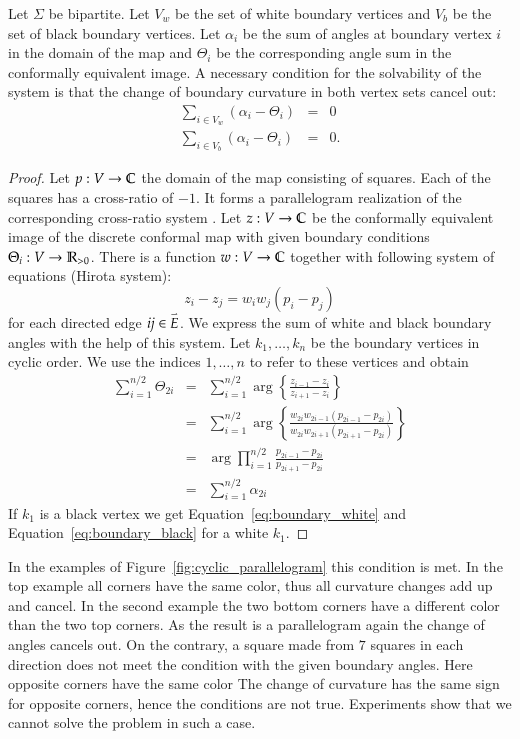 \documentclass[Thesis]{subfiles}
\begin{document}
\begin{theorem}
Let $\Sigma$ be bipartite. Let $V_w$ be the set of white boundary vertices and $V_b$ be the set of black boundary vertices.
Let $\alpha_i$ be the sum of angles at boundary vertex $i$ in the domain of the map and $\Theta_i$ be the corresponding angle sum in the conformally equivalent image.
A necessary condition for the solvability of the system is that the change of boundary curvature in both vertex sets cancel out:
\begin{eqnarray}
\sum_{i\in V_w}(\alpha_i - \Theta_i) &=& 0\label{eq:boundary_white}\\
\sum_{i\in V_b}(\alpha_i - \Theta_i) &=& 0\label{eq:boundary_black}.
\end{eqnarray}
\end{theorem}

\begin{proof}
Let $p:V\to \mathbb C$ the domain of the map consisting of squares. Each of the squares has a cross-ratio of $-1$. 
It forms a parallelogram realization of the corresponding cross-ratio system \cite[pp. 311--318]{BobenkoSuris2008}. 
Let $z:V\to \mathbb C$ be the conformally equivalent image of the discrete conformal map with given boundary conditions $\Theta_i:V\to \mathbb R_{>0}$. 
There is a function $w:V\to \mathbb C$ together with following system of equations (Hirota system):
\begin{equation*}
z_i-z_j=w_iw_j(p_i-p_j)
\end{equation*}
for each directed edge $\it ij \in \accentset{\rightharpoonup}{E}$.
We express the sum of white and black boundary angles with the help of this system. 
Let $k_1,\ldots,k_n$ be the boundary vertices in cyclic order.
We use the indices $1,\ldots,n$ to refer to these vertices and obtain
\begin{eqnarray*}
\sum_{i=1}^{n/2}\Theta_{2i} &=&\sum_{i=1}^{n/2}\arg\left\{\frac{z_{i-1}-z_i}{z_{i+1}-z_i}\right\}\\
&=&\sum_{i=1}^{n/2}\arg\left\{\frac{w_{2i}w_{2i-1}(p_{2i-1}-p_{2i})}{w_{2i}w_{2i+1}(p_{2i+1}-p_{2i})}\right\}\\
&=&\arg\prod_{i=1}^{n/2}\frac{p_{2i-1}-p_{2i}}{p_{2i+1}-p_{2i}}\\
&=&\sum_{i=1}^{n/2}\alpha_{2i}
\end{eqnarray*}
If $k_1$ is a black vertex we get Equation~\ref{eq:boundary_white} and Equation~\ref{eq:boundary_black} for a white $k_1$.
\end{proof}

In the examples of Figure~\ref{fig:cyclic_parallelogram} this condition is met. 
In the top example all corners have the same color, thus all curvature changes add up and cancel.
In the second example the two bottom corners have a different color than the two top corners.
As the result is a parallelogram again the change of angles cancels out.
On the contrary, a square made from $7$ squares in each direction does not meet the condition with the given boundary angles.
Here opposite corners have the same color
The change of curvature has the same sign for opposite corners, hence the conditions are not true.
Experiments show that we cannot solve the problem in such a case.
\end{document}
